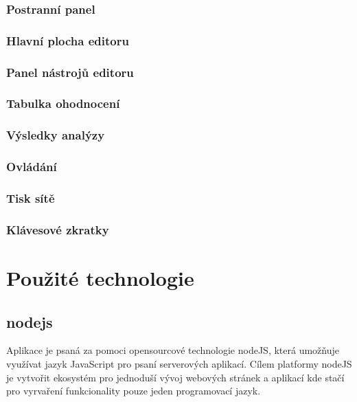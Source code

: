 \documentclass[
  biblatex,
  glossaries,
  index
]{kidiplom}
\begin{document}
\subsubsection{Postranní panel}\label{panel}
\subsubsection{Hlavní plocha editoru}\label{hlavní plocha}
\subsubsection{Panel nástrojů editoru}\label{panel nástrojů}
\subsubsection{Tabulka ohodnocení}\label{tabulka ohodnocení}
\subsubsection{Výsledky analýzy}\label{výsledky analýzy}


\subsubsection{Ovládání}

\subsubsection{Tisk sítě}

\subsubsection{Klávesové zkratky}





\section{Použité technologie}

\subsection{nodejs}
Aplikace je psaná za pomoci opensourcové technologie nodeJS, která umožňuje využívat jazyk
JavaScript pro psaní serverových aplikací. Cílem platformy nodeJS je vytvořit
ekosystém pro jednoduší vývoj webových stránek a aplikací kde stačí pro vyrvaření
funkcionality pouze jeden programovací jazyk.
\end{document}
